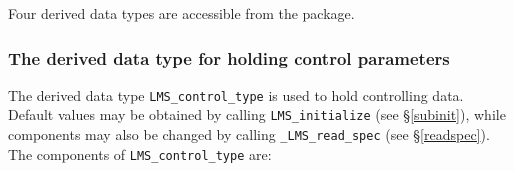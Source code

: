 \documentclass{galahad}
\newcommand{\packagename}{LMS}
\newcommand{\fullpackagename}{\libraryname\_\packagename}
\begin{document}




\galtypes
Four derived data types are accessible from the package.


\subsubsection{The derived data type for holding control
 parameters}\label{typecontrol}
The derived data type
{\tt \packagename\_control\_type}
is used to hold controlling data. Default values may be obtained by calling
{\tt \packagename\_initialize}
(see \S\ref{subinit}),
while components may also be changed by calling
{\tt \fullpackagename\_read\-\_spec}
(see \S\ref{readspec}).
The components of
{\tt \packagename\_control\_type}
are:
\end{document}
